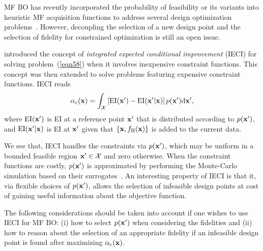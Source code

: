 \documentclass[iicol,sn-basic]{sn-jnl}%
\begin{document}
MF BO has recently incorporated the probability of feasibility or its variants into heuristic MF acquisition functions to address several design optimization problems~\citep[see e.g.,][]{Ghoreishi2019,Ruan2020,Ribeiro2023}.
However, decoupling the selection of a new design point and the selection of fidelity for constrained optimization is still an open issue.

\cite{Gramacy2011} introduced the concept of \textit{integrated expected conditional improvement} (IECI) for solving problem~(\ref{eqn58}) when it involves inexpensive constraint functions.
This concept was then extended to solve problems featuring expensive constraint functions.
IECI reads
\begin{equation}\label{eqn61}
	\alpha_\text{c}({\bf x}) = \int_{\mathcal{X}} \left[\text{EI}({\bf x'}) - \text{EI}({\bf x'}|{\bf x})\right] p({\bf x'}) \text{d}{\bf x'},
\end{equation}
where $\text{EI}({\bf x'})$ is EI at a reference point $\bf x'$ that is distributed according to $p({\bf x'})$, and $\text{EI}({\bf x'}|{\bf x})$ is EI at $\bf x'$ given that $\{{\bf x},f_\text{H}({\bf x})\}$ is added to the current data.

We see that, IECI handles the constraints via $p({\bf x'})$, which may be uniform in a bounded feasible region ${\bf x'} \in \mathcal{X}$ and zero otherwise.
When the constraint functions are costly, $p({\bf x'})$ is approximated by performing the Monte-Carlo simulation based on their surrogates~\citep{Gramacy2011}.
An interesting property of IECI is that it, via flexible choices of $p({\bf x'})$, allows the selection of infeasible design points at cost of gaining useful information about the objective function.

The following considerations should be taken into account if one wishes to use IECI for MF BO: (i) how to select $p({\bf x'})$ when considering the fidelities and (ii) how to reason about the selection of an appropriate fidelity if an infeasible design point is found after maximizing $\alpha_\text{c}({\bf x})$.  
\end{document}
